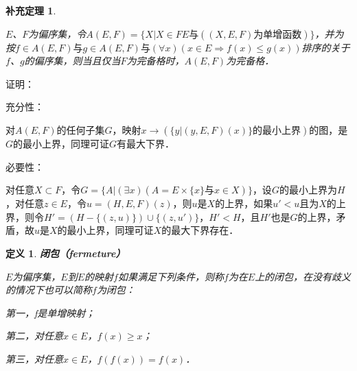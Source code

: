 \documentclass[12pt, a4paper, oneside]{book}
\newtheorem{cor}{补充定理}
\newtheorem{de}{定义}
\begin{document}
			\begin{cor}\label{cor197}
				\hfill\par
				$E$、$F$为偏序集，令$A(E, F)=\{X|X\in FE\text{与}((X, E, F)\text{为单增函数})\}$，并为按$f\in A(E, F)\text{与}g\in A(E, F)\text{与}(\forall x)(x\in E\Rightarrow f(x)\leq g(x))$排序的关于$f$、$g$的偏序集，则当且仅当$F$为完备格时，$A(E, F)$为完备格．
			\end{cor}
			证明：
			\par
			充分性：
			\par
			对$A(E, F)$的任何子集$G$，映射$x\to (\{y|(y, E, F)(x)\}\text{的最小上界})$的图，是$G$的最小上界，同理可证$G$有最大下界．
			\par
			必要性：
			\par
			对任意$X\subset F$，令$G=\{A|(\exists x)(A=E\times \{x\}\text{与}x\in X)\}$，设$G$的最小上界为$H$，对任意$z\in E$，令$u=(H, E, F)(z)$，则$u$是$X$的上界，如果$u'<u$且为$X$的上界，则令$H'=(H-\{(z, u)\})\cup\{(z, u')\}$，$H'<H$，且$H'$也是$G$的上界，矛盾，故$u$是$X$的最小上界，同理可证$X$的最大下界存在．

			\begin{de}
				\textbf{闭包（fermeture）}
				\par
				$E$为偏序集，$E$到$E$的映射$f$如果满足下列条件，则称$f$为在$E$上的闭包，在没有歧义的情况下也可以简称$f$为闭包：
				\par
				第一，f是单增映射；
				\par
				第二，对任意$x\in E$，$f(x)\geq x$；
				\par
				第三，对任意$x\in E$，$f(f(x))=f(x)$．
			\end{de}
			
\end{document}
